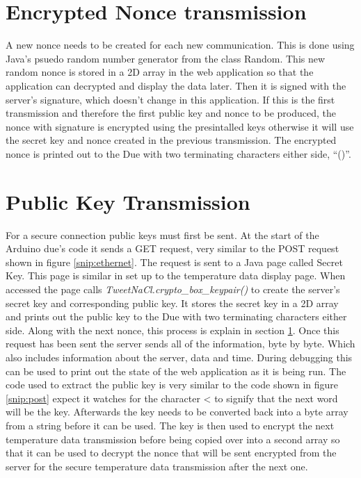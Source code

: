 \section{Encrypted Nonce transmission}
\label{nonce}
A new nonce needs to be created for each new communication. This is done using Java's psuedo random number generator from the class Random. This new random nonce is stored in a 2D array in the web application so that the application can decrypted and display the data later. Then it is signed with the server's signature, which doesn't change in this application. If this is the first transmission and therefore the first public key and nonce to be produced, the nonce with signature is encrypted using the presintalled keys otherwise it will use the secret key and nonce created in the previous transmission. The encrypted nonce is printed out to the Due with two terminating characters either side, ``()''.

\section{Public Key Transmission}
\label{pktransmit}

For a secure connection public keys must first be sent. At the start of the Arduino due's code it sends a GET request, very similar to the POST request shown in figure \ref{snip:ethernet}. The request is sent to a Java page called Secret Key. This page is similar in set up to the temperature data display page. When accessed the page calls \emph{TweetNaCl.crypto\_box\_keypair()} to create the server's secret key and corresponding public key. It stores the secret key in a 2D array and prints out the public key to the Due with two terminating characters either side. Along with the next nonce, this process is explain in section \ref{nonce}. Once this request has been sent the server sends all of the information, byte by byte. Which also includes information about the server, data and time. During debugging this can be used to print out the state of the web application as it is being run. The code used to extract the public key is very similar to the code shown in figure \ref{snip:post} expect it watches for the character < to signify that the next word will be the key. Afterwards the key needs to be converted back into a byte array from a string before it can be used. The key is then used to encrypt the next temperature data transmission before being copied over into a second array so that it can be used to decrypt the nonce that will be sent encrypted from the server for the secure temperature data transmission after the next one. 

